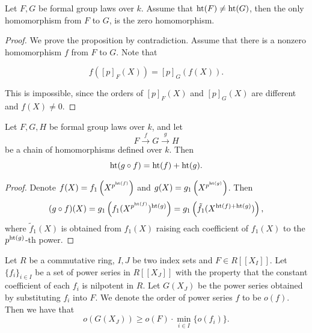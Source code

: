 
\begin{proposition}
    Let $F, G$ be formal group laws over $k$. Assume that
    $\mathrm{ht}(F) \neq \mathrm{ht}(G)$, then the only homomorphism from $F$ to $G$, is the zero homomorphism.
\end{proposition}

\begin{proof}
    We prove the proposition by contradiction. Assume that there is a nonzero homomorphism $f$
    from $F$ to $G$. Note that

    \[ f([p]_F(X)) = [p]_G (f(X)). \]

    This is impossible, since the orders of $[p]_F(X)$ and $[p]_G(X)$ are
    different and $f(X) \neq 0$.
\end{proof}

\begin{proposition}
    Let $F,G,H$ be formal group laws over $k$, and let
    \[F \stackrel{f}{\longrightarrow} G \stackrel{g}{\longrightarrow} H \]
    be a chain of homomorphisms defined over $k$. Then
    \[\mathrm{ht}(g \circ f) = \mathrm{ht}(f) + \mathrm{ht} (g). \]

    \label{prop: height_mul}
\end{proposition}

\begin{proof}
    Denote $f (X) = f_1 \left(X ^ {p ^ {\mathrm{ht} (f)}}\right)$ and $g(X) = g_1 \left(X ^ {p ^ {\mathrm{ht} (g)}}\right)$. Then
    \[(g\circ f) (X) = g_1 \left(f_1 (X ^ {p ^ {\mathrm{ht} (f)}}) ^ {\mathrm{ht} (g)}\right)
        = g_1 \left(\tilde{f}_1(X ^ {\mathrm{ht}(f) + \mathrm{ht}(g)})\right), \]
    where $\tilde{f}_1 (X)$ is obtained from $f_1(X)$ raising each coefficient of
    $f_1(X)$ to the $p^{\mathrm{ht}(g)}$-th power.
\end{proof}

\begin{lemma}
    Let $R$ be a commutative ring, $I, J$ be two index sets and
    $F \in R[\![X_I]\!]$. Let $\{f_i\}_{i\in I}$ be a set of power series in
    $R[\![X_J]\!]$ with the property that the constant
    coefficient of each $f_i$ is nilpotent in $R$.
    Let $G(X_J)$ be the power series obtained by substituting
    $f_i$ into $F$.
    We denote the order of power series $f$ to be $o(f)$.
    Then we have that
    \[o(G(X_J)) \ge o(F) \cdot  \min_{i\in I}\{o(f_i)\}. \]


    \label{lem: order_subst}
\end{lemma}

